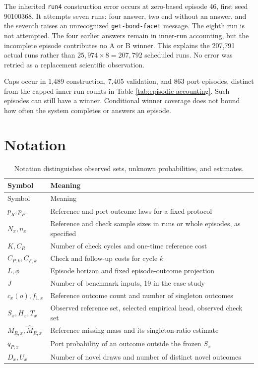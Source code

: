 \documentclass[10pt,letterpaper]{article}
\begin{document}


The inherited \texttt{run4} construction error occurs at zero-based episode 46, first seed
90100368. It attempts seven runs: four answer, two end without an answer, and the seventh
raises an unrecognized \texttt{get-bond-facet} message. The eighth run is not attempted.
The four earlier answers remain in inner-run accounting, but the incomplete episode
contributes no A or B winner. This explains the 207,791 actual runs rather than
\(25,974\times8=207,792\) scheduled runs. No error was retried as a replacement scientific
observation.

Caps occur in 1,489 construction, 7,405 validation, and 863 port episodes, distinct from
the capped inner-run counts in Table \ref{tab:episodic-accounting}. Such episodes can
still have a winner. Conditional winner coverage does not bound how often the system
completes or answers an episode.

\clearpage

\section{Notation}\label{app:notation}

\begin{longtable}[]{@{}ll@{}}
\caption{Notation distinguishes observed sets, unknown probabilities, and
estimates.}\tabularnewline
\toprule\noalign{}
Symbol & Meaning \\
\midrule\noalign{}
\endfirsthead
\toprule\noalign{}
Symbol & Meaning \\
\midrule\noalign{}
\endhead
\bottomrule\noalign{}
\endlastfoot
\(p_R,p_P\) & Reference and port outcome laws for a fixed protocol \\
\(N_x,n_x\) & Reference and check sample sizes in runs or whole episodes, as specified \\
\(K,C_R\) & Number of check cycles and one-time reference cost \\
\(C_{P,k},C_{F,k}\) & Check and follow-up costs for cycle \(k\) \\
\(L,\phi\) & Episode horizon and fixed episode-outcome projection \\
\(J\) & Number of benchmark inputs, 19 in the case study \\
\(c_x(o),f_{1,x}\) & Reference outcome count and number of singleton outcomes \\
\(S_x,H_x,T_x\) & Observed reference set, selected empirical head, observed check set \\
\(M_{R,x},\widehat M_{R,x}\) & Reference missing mass and its singleton-ratio estimate \\
\(q_{P,x}\) & Port probability of an outcome outside the frozen \(S_x\) \\
\(D_x,U_x\) & Number of novel draws and number of distinct novel outcomes \\
\end{longtable}
\end{document}
